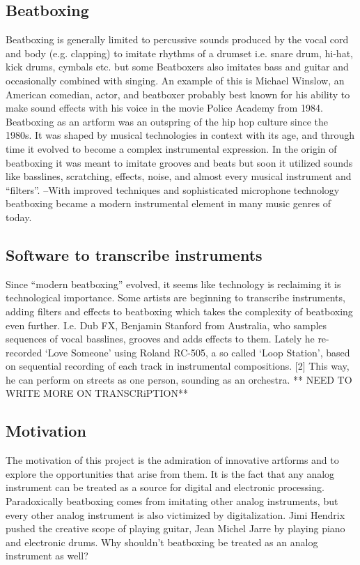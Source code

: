 \subsection{ Beatboxing }
Beatboxing is generally limited to percussive sounds produced by the vocal cord and body (e.g. clapping) to imitate rhythms of a drumset i.e. snare drum, hi-hat, kick drums, cymbals etc. but some Beatboxers also imitates bass and guitar and occasionally combined with singing. An example of this is Michael Winslow, an American comedian, actor, and beatboxer probably best known for his ability to make sound effects with his voice in the movie Police Academy from 1984. Beatboxing as an artform was an outspring of the hip hop culture since the 1980s. It was shaped by musical technologies in context with its age, and through time it evolved to become a complex instrumental expression. In the origin of beatboxing it was meant to imitate grooves and beats but soon it utilized sounds like basslines, scratching, effects, noise, and almost every musical instrument and “filters”. –With improved techniques and sophisticated microphone technology beatboxing became a modern instrumental element in many music genres of today.
\subsection{ Software to transcribe instruments }
Since “modern beatboxing” evolved, it seems like technology is reclaiming it is technological importance. Some artists are beginning to transcribe instruments, adding filters and effects to beatboxing which takes the complexity of beatboxing even further. I.e. Dub FX, Benjamin Stanford from Australia, who samples sequences of vocal basslines, grooves and adds effects to them. Lately he re-recorded ‘Love Someone’ using Roland RC-505, a so called ‘Loop Station’, based on sequential recording of each track in instrumental compositions. [2] This way, he can perform on streets as one person, sounding as an orchestra. ** NEED TO WRITE MORE ON TRANSCRiPTION**
\subsection{ Motivation }
The motivation of this project is the admiration of innovative artforms and to explore the opportunities that arise from them. It is the fact that any analog instrument can be treated as a source for digital and electronic processing. Paradoxically beatboxing comes from imitating other analog instruments, but every other analog instrument is also victimized by digitalization. Jimi Hendrix pushed the creative scope of playing guitar, Jean Michel Jarre by playing piano and electronic drums. Why shouldn’t beatboxing be treated as an analog instrument as well? 
